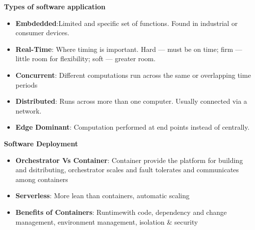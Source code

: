 \documentclass[10pt, landscape]{article}
\begin{document}
\raggedright
\footnotesize
\begin{multicols}{4}


\setlength{\columnseprule}{0.25pt}
\setlength{\premulticols}{1pt}
\setlength{\postmulticols}{1pt}
\setlength{\multicolsep}{1pt}
\setlength{\columnsep}{2pt}

\begin{center}
\end{center}


\textbf{Types of software application}
\begin{itemize}
  \item \textbf{Embdedded}:Limited and specific set of functions.
  Found in industrial or consumer devices.
  \item \textbf{Real-Time}: Where timing is important. Hard —
  must be on time; firm — little room for flexibility;
  soft — greater room.
  \item \textbf{Concurrent}: Different computations run across the
  same or overlapping time periods
  \item \textbf{Distributed}: Runs across more than one computer.
  Usually connected via a network.
  \item \textbf{Edge Dominant}: Computation performed at end points instead of centrally.
\end{itemize}

\textbf{Software Deployment}
\begin{itemize}
  \item \textbf{Orchestrator Vs Container}: Container provide the platform for building and dsitributing, orchestrator scales and fault tolerates and communicates among containers 
  \item \textbf{Serverless}: More lean than containers, automatic scaling 
  \item \textbf{Benefits of Containers}: Runtimewith code, dependency and change management, environment management, isolation \& security
\end{itemize}


\end{multicols}
\end{document}
